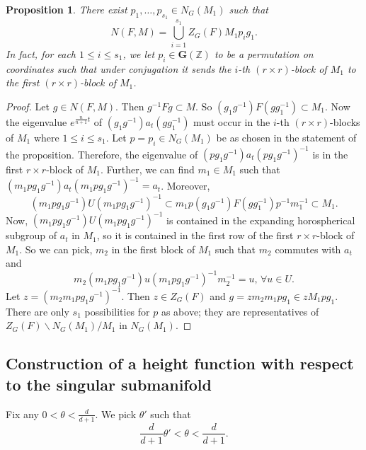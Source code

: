 \documentclass[12pt,reqno]{amsart}
\numberwithin{equation}{section}
\theoremstyle{plain}
\newtheorem{prop}[thm]{Proposition}
\theoremstyle{definition}
\theoremstyle{remark}
\newcommand\bfG{\mathbf{G}}
\newcommand{\Z}{\mathbb{Z}}
\begin{document}
 \begin{prop}
        \label{prop:ZFM}
        There exist $p_1,\ldots,p_{s_1}\in N_G(M_1)$ such that 
        \[
        N(F,M)=\bigcup_{i=1}^{s_1} Z_G(F)M_1p_ig_1.
        \]
        In fact, for each $1\leq i\leq s_1$, we let $p_i\in \bfG(\Z)$ to be a permutation on coordinates such that under conjugation it sends the $i$-th $(r\times r)$-block of $M_1$ to the first $(r\times r)$-block of $M_1$. 
    \end{prop}
    \begin{proof} Let $g\in N(F,M)$. Then $g^{-1}Fg\subset M$. So $(g_1g^{-1})F(gg_1^{-1})\subset M_1$. Now the eigenvalue $e^{\frac{n}{n+1}t}$ of $(g_1g^{-1})a_t(gg_1^{-1})$ must occur in the $i$-th $(r\times r)$-blocks of $M_1$ where $1\leq i\leq s_1$. Let $p=p_i\in N_G(M_1)$ be as chosen in the statement of the proposition. Therefore, the eigenvalue of $(pg_1g^{-1})a_t(pg_1g^{-1})^{-1}$ is in the first $r\times r$-block of $M_1$. Further, we can find $m_1\in M_1$ such that $(m_1pg_1g^{-1})a_t(m_1pg_1g^{-1})^{-1}=a_t$. Moreover, 
    \[
(m_1pg_1g^{-1})U(m_1pg_1g^{-1})^{-1}\subset m_1p(g_1g^{-1})F(gg_1^{-1})p^{-1}m_1^{-1}\subset M_1.
    \]
    Now, $(m_1pg_1g^{-1})U(m_1pg_1g^{-1})^{-1}$ is contained in the expanding horospherical subgroup of $a_t$ in $M_1$, so it is contained in the first row of the first $r\times r$-block of $M_1$. So we can pick, $m_2$ in the first block of $M_1$ such that $m_2$ commutes with $a_t$ and 
\[m_2(m_1pg_1g^{-1})u(m_1pg_1g^{-1})^{-1}m_2^{-1}=u, \, \forall u\in U.
\]
Let $z=(m_2m_1pg_1g^{-1})^{-1}$. Then $z\in Z_G(F)$ and $g=zm_2m_1pg_1\in zM_1pg_1$. There are only $s_1$ possibilities for $p$ as above; they are representatives of $Z_G(F)\backslash N_G(M_1)/M_1$ in $N_G(M_1)$.
    \end{proof}

    
    
    \subsection{Construction of a height function with respect to the singular submanifold} \label{sec:Mf}

    Fix any $0<\theta<\frac{d}{d+1}$. We pick $\theta'$ such that 
    \begin{equation} \label{eq:theta and theta'}
        \frac{d}{d+1}\theta'<\theta<\frac{d}{d+1}.
    \end{equation}
\end{document}
